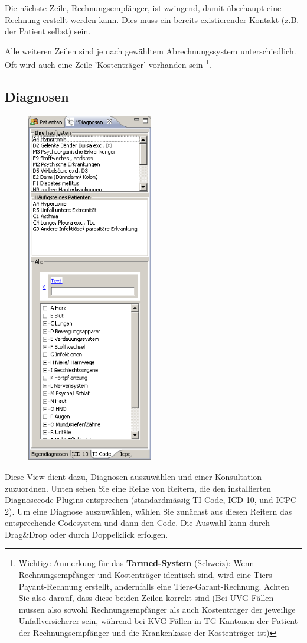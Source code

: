 Die nächste Zeile, Rechnungsempfänger, ist zwingend, damit überhaupt eine Rechnung erstellt werden kann. Dies muss ein bereits existierender Kontakt (z.B. der Patient selbst) sein. 

\medskip
Alle weiteren Zeilen sind je nach gewähltem Abrechnungssystem unterschiedlich. Oft wird auch eine Zeile 'Kostenträger' vorhanden sein \footnote{Wichtige Anmerkung für das \textbf{Tarmed-System} (Schweiz): Wenn Rechnungsempfänger und Kostenträger identisch sind, wird eine Tiers Payant-Rechnung erstellt, andernfalls eine Tiers-Garant-Rechnung. Achten Sie also darauf, dass diese beiden Zeilen korrekt sind (Bei UVG-Fällen müssen also sowohl Rechnungsempfänger als auch Kostenträger der jeweilige Unfallversicherer sein, während bei KVG-Fällen in TG-Kantonen der Patient der Rechnungsempfänger und die Krankenkasse der Kostenträger ist)}.


\subsection{Diagnosen}
\label{view:diagnosen} 
\begin{figure}
    \includegraphics[width=5.5cm]{images/diagnosenview}
    \label{fig:diagnosen}
\end{figure}
Diese View dient dazu, Diagnosen auszuwählen und einer Konsultation zuzuordnen. Unten sehen Sie eine Reihe von Reitern, die den installierten Diagnosecode-Plugins entsprechen (standardmässig TI-Code, ICD-10, und ICPC-2). Um eine Diagnose auszuwählen, wählen Sie zunächst aus diesen Reitern das entsprechende Codesystem und dann den Code. Die Auswahl kann durch Drag\&Drop oder durch Doppelklick erfolgen.

